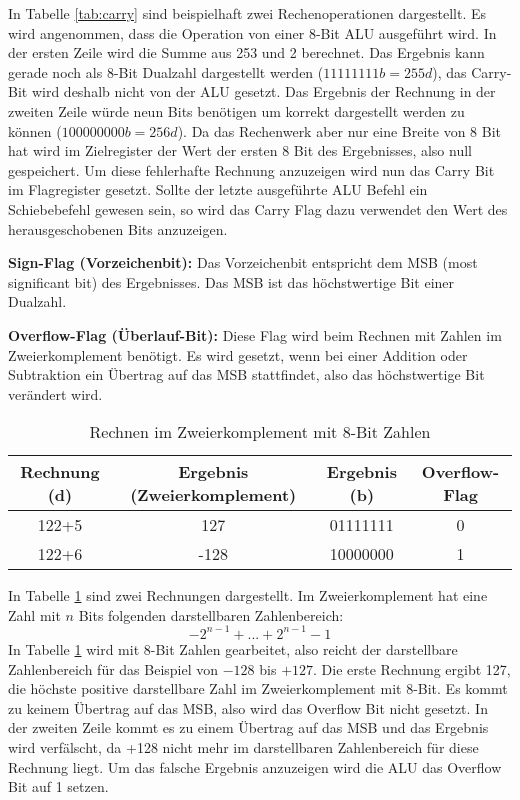 \documentclass[12pt]{article}
\begin{document}
\noindent In Tabelle \ref{tab:carry} sind beispielhaft zwei Rechenoperationen dargestellt. Es wird angenommen, dass die Operation von einer 8-Bit ALU ausgeführt wird. In der ersten Zeile wird die Summe aus 253 und 2 berechnet. Das Ergebnis kann gerade noch als 8-Bit Dualzahl dargestellt werden ($11111111b = 255d$), das Carry-Bit wird deshalb nicht von der ALU gesetzt. Das Ergebnis der Rechnung in der zweiten Zeile  würde neun Bits benötigen um korrekt dargestellt werden zu können ($100000000b = 256d$). Da das Rechenwerk aber nur eine Breite von 8 Bit hat wird im Zielregister der Wert der ersten 8 Bit des Ergebnisses, also null gespeichert. Um diese fehlerhafte Rechnung anzuzeigen wird nun das Carry Bit im Flagregister gesetzt.  
Sollte der letzte ausgeführte ALU Befehl ein Schiebebefehl gewesen sein, so wird das Carry Flag dazu verwendet den Wert des herausgeschobenen Bits anzuzeigen.

\par\bigskip\noindent \textbf{Sign-Flag (Vorzeichenbit):} Das Vorzeichenbit entspricht dem MSB (most significant bit) des Ergebnisses. Das MSB ist das höchstwertige Bit einer Dualzahl.

 \par\bigskip\noindent \textbf{Overflow-Flag (Überlauf-Bit):} Diese Flag wird beim Rechnen mit Zahlen im Zweierkomplement benötigt. Es wird gesetzt, wenn bei einer Addition oder Subtraktion ein Übertrag auf das MSB stattfindet, also das höchstwertige Bit verändert wird. 
\begin{table}[!htb]
\centering
\begin{tabular}{|c|c|c|c|}
\hline
Rechnung (d) & Ergebnis (Zweierkomplement) & Ergebnis (b) & Overflow-Flag \\ \hline 
122+5        & 127                         & 01111111     & 0            \\ \hline 
122+6        & -128                        & 10000000      & 1            \\ \hline

\end{tabular}
\caption{Rechnen im Zweierkomplement mit 8-Bit Zahlen}

\label{tab:overflow}
\end{table}

\noindent In Tabelle \ref{tab:overflow} sind zwei Rechnungen dargestellt. Im Zweierkomplement hat eine Zahl mit $n$ Bits folgenden darstellbaren Zahlenbereich: 
$${-2}^{n-1}+ ... +2^{n-1}-1$$
In Tabelle \ref{tab:overflow} wird mit 8-Bit Zahlen gearbeitet, also reicht der darstellbare Zahlenbereich für das Beispiel von $-128$ bis $+127$. Die erste Rechnung ergibt 127, die höchste positive darstellbare Zahl im Zweierkomplement mit 8-Bit. Es kommt zu keinem Übertrag auf das MSB, also wird das Overflow Bit nicht gesetzt. In der zweiten Zeile kommt es zu einem Übertrag auf das MSB und das Ergebnis wird verfälscht, da +128 nicht mehr im darstellbaren Zahlenbereich für diese Rechnung liegt. Um das falsche Ergebnis anzuzeigen wird die ALU das Overflow Bit auf 1 setzen. 
\end{document}

